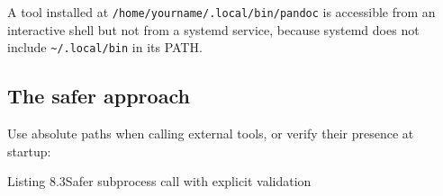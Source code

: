 \noindent{}A tool installed at \texttt{/}\allowbreak{}\texttt{home/}\allowbreak{}\texttt{yourname/}\allowbreak{}\texttt{.}\allowbreak{}\texttt{local/}\allowbreak{}\texttt{bin/}\allowbreak{}\texttt{pandoc} is accessible from an interactive shell but not from a systemd service, because systemd does not include \texttt{\textasciitilde{}/.local/bin} in its PATH.

\subsection*{The safer approach}\label{08-hidden-dependencies:the-safer-approach}

Use absolute paths when calling external tools, or verify their presence at startup:

\begin{codeboxcap}{\textcolor{accent}{Listing 8.3}\enspace Safer subprocess call with explicit validation}

\begin{Shaded}
\begin{Highlighting}[]

\NormalTok{) }\OperatorTok{{-}\textgreater{}} \NormalTok{:}
\OperatorTok{=}\SpecialCharTok{\{}\SpecialCharTok{\}}\NormalTok{)}
         
             \NormalTok{(}\SpecialCharTok{\{}\SpecialCharTok{\}}\SpecialCharTok{\{}\SpecialCharTok{\}}\NormalTok{)}

\OperatorTok{=}
     \NormalTok{:}
         \NormalTok{(}
            \SpecialCharTok{\{}\SpecialCharTok{\}}
            \SpecialCharTok{\{}\SpecialCharTok{\}}
\NormalTok{        )}


\end{Highlighting}
\end{Shaded}
\end{codeboxcap}
